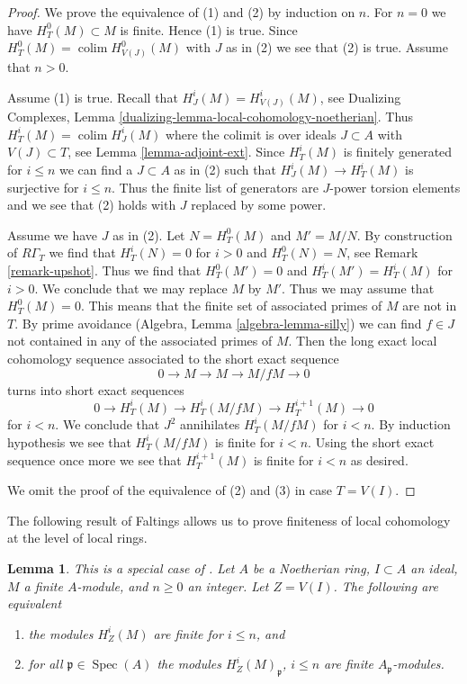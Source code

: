 \documentclass{stacks-project}
\newenvironment{reference}{\comment}{\endcomment}
\theoremstyle{plain}
\newtheorem{lemma}[subsection]{Lemma}
\theoremstyle{definition}
\theoremstyle{remark}
\numberwithin{equation}{subsection}
\def\colim{\mathop{\mathrm{colim}}\nolimits}
\def\Spec{\mathop{\mathrm{Spec}}}
\begin{document}
\begin{proof}
We prove the equivalence of (1) and (2) by induction on $n$.
For $n = 0$ we have $H^0_T(M) \subset M$ is finite. Hence (1) is true.
Since $H^0_T(M) = \colim H^0_{V(J)}(M)$ with $J$ as in (2) we see
that (2) is true. Assume that $n > 0$.

\medskip\noindent
Assume (1) is true. Recall that $H^i_J(M) = H^i_{V(J)}(M)$, see
Dualizing Complexes, Lemma \ref{dualizing-lemma-local-cohomology-noetherian}.
Thus $H^i_T(M) = \colim H^i_J(M)$ where the colimit is over ideals
$J \subset A$ with $V(J) \subset T$, see
Lemma \ref{lemma-adjoint-ext}. Since $H^i_T(M)$ is finitely generated
for $i \leq n$ we can find a $J \subset A$ as in (2) such that
$H^i_J(M) \to H^i_T(M)$ is surjective for $i \leq n$.
Thus the finite list of generators are $J$-power torsion elements
and we see that (2) holds with $J$ replaced by some power.

\medskip\noindent
Assume we have $J$ as in (2). Let $N = H^0_T(M)$ and $M' = M/N$.
By construction of $R\Gamma_T$ we find that
$H^i_T(N) = 0$ for $i > 0$ and $H^0_T(N) = N$, see
Remark \ref{remark-upshot}. Thus we find that
$H^0_T(M') = 0$ and $H^i_T(M') = H^i_T(M)$ for $i > 0$.
We conclude that we may replace $M$ by $M'$.
Thus we may assume that $H^0_T(M) = 0$.
This means that the finite set of associated primes of $M$
are not in $T$. By prime avoidance (Algebra, Lemma \ref{algebra-lemma-silly})
we can find $f \in J$ not contained in any of the associated primes of $M$.
Then the long exact local cohomology sequence associated to the short
exact sequence
$$
0 \to M \to M \to M/fM \to 0
$$
turns into short exact sequences
$$
0 \to H^i_T(M) \to H^i_T(M/fM) \to H^{i + 1}_T(M) \to 0
$$
for $i < n$. We conclude that $J^2$ annihilates $H^i_T(M/fM)$
for $i < n$. By induction hypothesis we see that $H^i_T(M/fM)$
is finite for $i < n$. Using the short exact sequence once more
we see that $H^{i + 1}_T(M)$ is finite for $i < n$ as desired.

\medskip\noindent
We omit the proof of the equivalence of (2) and (3)
in case $T = V(I)$.
\end{proof}

\noindent
The following result of Faltings allows us to prove finiteness
of local cohomology at the level of local rings.

\begin{lemma}
\label{lemma-check-finiteness-local-cohomology-locally}
\begin{reference}
This is a special case of \cite[Satz 1]{Faltings-finiteness}.
\end{reference}
Let $A$ be a Noetherian ring, $I \subset A$ an ideal, $M$ a finite
$A$-module, and $n \geq 0$ an integer. Let $Z = V(I)$.
The following are equivalent
\begin{enumerate}
\item the modules $H^i_Z(M)$ are finite for $i \leq n$, and
\item for all $\mathfrak p \in \Spec(A)$ the modules
$H^i_Z(M)_\mathfrak p$, $i \leq n$ are finite $A_\mathfrak p$-modules.
\end{enumerate}
\end{lemma}
\end{document}
